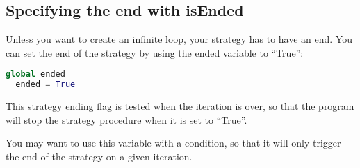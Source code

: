 \documentclass[a4paper,11pt]{article}
\begin{document}
\subsection{Specifying the end with isEnded}

Unless you want to create an infinite loop, your strategy has to have
an end. You can set the end of the strategy by using the ended
variable to ``True'':

\begin{lstlisting}[language=Python]
  global ended
  ended = True
\end{lstlisting}

This strategy ending flag is tested when the iteration is over, so
that the program will stop the strategy procedure when it is set to
``True''.

You may want to use this variable with a condition, so that it will
only trigger the end of the strategy on a given iteration.



\end{document}
